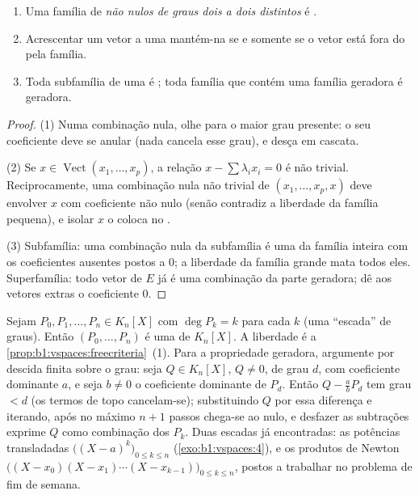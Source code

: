 \begin{proposition}\label{prop:b1:vspaces:freecriteria}
\begin{enumerate}
  \item Uma família de \emph{ não nulos de graus dois a
        dois distintos} é .
  \item Acrescentar um vetor a uma  mantém-na  se e
        somente se o vetor está fora do  pela família.
  \item Toda subfamília de uma  é ; toda família
        que contém uma família geradora é geradora.
\end{enumerate}
\end{proposition}

\begin{proof}
(1) Numa combinação nula, olhe para o maior grau presente: o seu
coeficiente deve se anular (nada cancela esse grau), e desça em
cascata.

(2) Se $x \in \operatorname{Vect}(x_1, \dots, x_p)$, a relação $x
- \sum\lambda_i x_i = 0$ é não trivial. Reciprocamente, uma
combinação nula não trivial de $(x_1, \dots, x_p, x)$ deve envolver $x$ com
coeficiente não nulo (senão contradiz a liberdade da família
pequena), e isolar $x$ o coloca no .

(3) Subfamília: uma combinação nula da subfamília é uma da família
inteira com os coeficientes ausentes postos a $0$; a liberdade da
família grande mata todos eles. Superfamília: todo vetor de $E$ já é
uma combinação da parte geradora; dê aos vetores extras o
coeficiente $0$.
\end{proof}

\begin{example}
\label{ex:b1:vspaces:staircase}
Sejam $P_0, P_1, \dots, P_n \in K_n[X]$ com $\deg P_k = k$ para cada $k$ (uma
``escada'' de graus). Então $(P_0, \dots, P_n)$ é uma  de $K_n[X]$. A liberdade
é a \cref{prop:b1:vspaces:freecriteria}~(1). Para a propriedade geradora, argumente por descida
finita sobre o grau: seja $Q \in
K_n[X]$, $Q \neq 0$, de grau $d$, com coeficiente
dominante $a$, e seja $b \neq 0$ o coeficiente dominante de $P_d$. Então
$Q -
\frac ab P_d$ tem grau $< d$ (os termos de topo cancelam-se); substituindo
$Q$ por essa diferença e iterando, após no máximo $n + 1$ passos
chega-se ao  nulo, e desfazer as subtrações exprime $Q$ como
combinação dos $P_k$. Duas escadas já encontradas: as potências
transladadas $\bigl((X-a)^k\bigr)_{0 \leq k
\leq n}$ (\cref{exo:b1:vspaces:4}), e os produtos de Newton
$\bigl((X - x_0)(X - x_1)\cdots(X - x_{k-1})\bigr)_{0 \leq k \leq
n}$, postos a trabalhar no problema de fim de semana.
\end{example}

